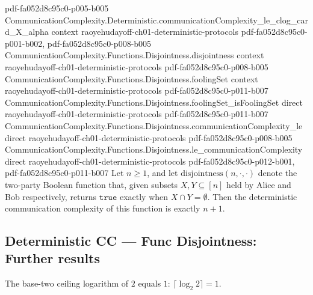 \begin{theorem}
{    pdf-fa052d8c95c0-p005-b005}
\proofstep
  {CommunicationComplexity.Deterministic.communicationComplexity_le_clog_card_X_alpha}
  {context}
  {raoyehudayoff-ch01-deterministic-protocols}
  {pdf-fa052d8c95c0-p001-b002,
    pdf-fa052d8c95c0-p008-b005}
\proofstep
  {CommunicationComplexity.Functions.Disjointness.disjointness}
  {context}
  {raoyehudayoff-ch01-deterministic-protocols}
  {pdf-fa052d8c95c0-p008-b005}
\proofstep
  {CommunicationComplexity.Functions.Disjointness.foolingSet}
  {context}
  {raoyehudayoff-ch01-deterministic-protocols}
  {pdf-fa052d8c95c0-p011-b007}
\proofstep
  {CommunicationComplexity.Functions.Disjointness.foolingSet_isFoolingSet}
  {direct}
  {raoyehudayoff-ch01-deterministic-protocols}
  {pdf-fa052d8c95c0-p011-b007}
\proofstep
  {CommunicationComplexity.Functions.Disjointness.communicationComplexity_le}
  {direct}
  {raoyehudayoff-ch01-deterministic-protocols}
  {pdf-fa052d8c95c0-p008-b005}
\proofstep
  {CommunicationComplexity.Functions.Disjointness.le_communicationComplexity}
  {direct}
  {raoyehudayoff-ch01-deterministic-protocols}
  {pdf-fa052d8c95c0-p012-b001,
    pdf-fa052d8c95c0-p011-b007}
Let $n \geq 1$, and let $\mathrm{disjointness}(n, \cdot, \cdot)$ denote the two-party
Boolean function that, given subsets $X, Y \subseteq [n]$ held by Alice and Bob
respectively, returns $\mathtt{true}$ exactly when $X \cap Y = \emptyset$. Then the
deterministic communication complexity of this function is exactly $n + 1$.
\end{theorem}

\subsection*{Deterministic CC --- Func Disjointness: Further results}

\begin{theorem}
\label{CommunicationComplexity.Functions.Disjointness.clog_two_two}
\leanok
{}
The base-two ceiling logarithm of $2$ equals $1$: $\lceil\log_2 2\rceil=1$.
\end{theorem}

